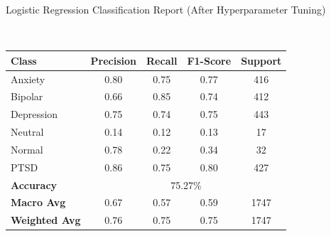 \begin{center}
\caption{Logistic Regression Classification Report (After Hyperparameter Tuning)} \\
\begin{tabular}{|l|c|c|c|c|}
\hline
\textbf{Class} & \textbf{Precision} & \textbf{Recall} & \textbf{F1-Score} & \textbf{Support} \\ \hline
Anxiety        & 0.80               & 0.75            & 0.77              & 416              \\ \hline
Bipolar        & 0.66               & 0.85            & 0.74              & 412              \\ \hline
Depression     & 0.75               & 0.74            & 0.75              & 443              \\ \hline
Neutral        & 0.14               & 0.12            & 0.13              & 17               \\ \hline
Normal         & 0.78               & 0.22            & 0.34              & 32               \\ \hline
PTSD           & 0.86               & 0.75            & 0.80              & 427              \\ \hline
\textbf{Accuracy} & \multicolumn{4}{|c|}{75.27\%} \\ \hline
\textbf{Macro Avg} & 0.67            & 0.57            & 0.59              & 1747             \\ \hline
\textbf{Weighted Avg} & 0.76         & 0.75            & 0.75              & 1747             \\ \hline
\end{tabular} \\

  \vspace{0.25in}%


\end{center}
